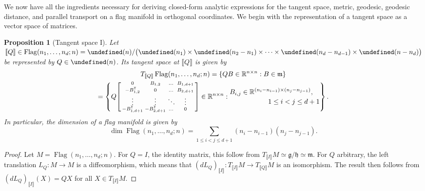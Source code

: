 \documentclass[11pt,reqno]{amsart}%
\newtheorem{proposition}[theorem]{Proposition}
\theoremstyle{definition}
\theoremstyle{remark}
\newcommand{\tp}{{\scriptscriptstyle\mathsf{T}}}
\newcommand{\lb}{\llbracket}
\newcommand{\rb}{\rrbracket}
\let\O\undefined
\DeclareMathOperator{\Flag}{Flag}
\DeclareMathOperator{\O}{O}
\begin{document}
We  now have all the ingredients necessary for deriving closed-form analytic  expressions for the tangent space, metric, geodesic, geodesic distance, and parallel transport on a flag manifold in orthogonal coordinates. We begin with the representation of a tangent  space as a vector space of matrices.
\begin{proposition}[Tangent space I]\label{prop:tangent1}
Let $\lb Q \rb\in \Flag(n_1,\dots, n_d;n) = \O(n) / \bigl(\O(n_1) \times \O(n_2 - n_1) \times \dots \times \O(n_d - n_{d-1}) \times \O(n-n_d) \bigr)$ be represented by $Q\in \O(n)$. Its tangent space at $\lb Q \rb$  is given by
\begin{multline*}
T_{\lb Q \rb}  \Flag(n_1,\dots, n_d;n)  = \lbrace QB \in \mathbb{R}^{n \times n} : B \in \mathfrak{m}\rbrace \\
=\left\lbrace Q\begin{bsmallmatrix}
0 & B_{1,2}  &\dots & B_{1,d+1} \\
-B_{1,2}^\tp  & 0   &\dots & B_{2,d+1} \\
\vdots & \vdots & \ddots & \vdots\\
-B_{1,d+1}^\tp  & -B_{2,d+1}^\tp  & \dots & 0
\end{bsmallmatrix} \in \mathbb{R}^{n \times n} :\begin{multlined} B_{i,j}\in \mathbb{R}^{(n_i-n_{i-1}) \times (n_j-n_{j-1})}, \\ 1\le i < j \le d + 1 \end{multlined} \right\rbrace.
\end{multline*}
In particular, the dimension of a flag manifold is  given by
\[
\dim \Flag(n_1,\dots, n_d;n) = \sum_{1 \le i < j \le d+1} (n_i-n_{i-1}) (n_j - n_{j-1}).
\]
\end{proposition}
\begin{proof}
Let $M = \Flag(n_1,\dots, n_d;n) $. 
For $Q = I$, the identity matrix, this follow from $T_{\lb I \rb} M \simeq \mathfrak{g}/\mathfrak{h} \simeq \mathfrak{m}$. For $Q$ arbitrary, the left translation $L_Q: M \to M$ is a diffeomorphism, which means that $(d {L_Q})_{\lb I \rb} : T_{\lb I \rb} M \to T_{\lb Q \rb} M$ is an  isomorphism. The result then follows from $(d {L_Q})_{\lb I \rb} (X) = QX$ for all $X \in T_{\lb I \rb} M$.
\end{proof}
\end{document}
